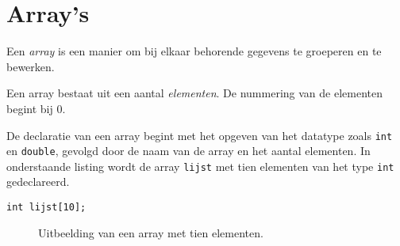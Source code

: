\chapter{Array's}
\label{cha:arrays}
\thispagestyle{empty}

Een \textsl{array} is een manier om bij elkaar behorende gegevens te groeperen en te bewerken.

Een array bestaat uit een aantal \textsl{elementen}. De nummering van de elementen begint bij 0.

De declaratie van een array begint met het opgeven van het datatype zoals \texttt{int} en \texttt{double}, gevolgd door de naam van de array en het aantal elementen. In onderstaande listing wordt de array \texttt{lijst} met tien elementen van het type \texttt{int} gedeclareerd.

\begin{lstlisting}[caption=Declaratie van een array met tien elementen]
int lijst[10];
\end{lstlisting}



\begin{figure}[!ht]
\centering
{}
\caption{Uitbeelding van een array met tien elementen.}
\label{fig:arryinmem}
\end{figure}
